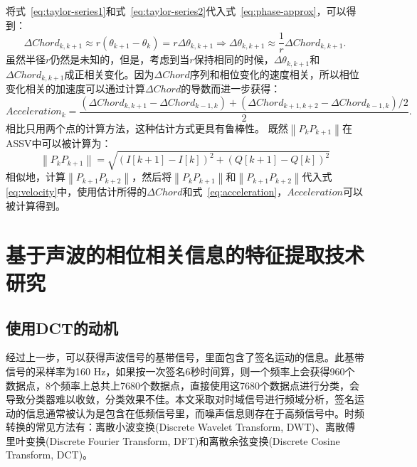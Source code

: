 将式~\eqref{eq:taylor-series1}和式~\eqref{eq:taylor-series2}代入式~\eqref{eq:phase-approx}，可以得到：
\begin{equation}
 \Delta Chord_{k,k+1} \approx r(\theta_{k+1} - \theta_{k})=r\Delta \theta_{k,k+1} \Rightarrow \Delta \theta_{k,k+1} \approx \frac{1}{r}\Delta Chord_{k,k+1}.  \label{eq:velocity}
\end{equation}
虽然半径$r$仍然是未知的，但是，考虑到当$r$保持相同的时候，$\Delta \theta_{k,k+1}$和$\Delta Chord_{k,k+1}$成正相关变化。因为$\Delta Chord$序列和相位变化的速度相关，所以相位变化相关的加速度可以通过计算$\Delta Chord$的导数而进一步获得：
\begin{equation}
Acceleration_{k} = \frac{\left( \Delta Chord_{k,k+1} - \Delta Chord_{k-1,k} \right) + \left( \Delta Chord_{k+1,k+2}- \Delta Chord_{k-1,k}\right)/2}{2}. \label{eq:acceleration}
\end{equation}
相比只用两个点的计算方法，这种估计方式更具有鲁棒性。
既然$\left\|P_{k}P_{k+1}\right\|$在ASSV中可以被计算为：
\begin{equation}
  \left\|P_{k}P_{k+1}\right\|= \sqrt{\left( I[k+1] - I[k] \right)^2 + \left( Q[k+1] - Q[k] \right)^2}
\end{equation}
相似地，计算$\left\|P_{k+1}P_{k+2}\right\|$，然后将$\left\|P_{k}P_{k+1}\right\|$和$\left\|P_{k+1}P_{k+2}\right\|$代入式\eqref{eq:velocity}中，使用估计所得的$\Delta Chord $和式~\eqref{eq:acceleration}，$Acceleration$可以被计算得到。



\section{基于声波的相位相关信息的特征提取技术研究}
\subsection{使用DCT的动机}
经过上一步，可以获得声波信号的基带信号，里面包含了签名运动的信息。此基带信号的采样率为160 Hz，如果按一次签名6秒时间算，则一个频率上会获得960个数据点，8个频率上总共上7680个数据点，直接使用这7680个数据点进行分类，会导致分类器难以收敛，分类效果不佳。本文采取对时域信号进行频域分析，签名运动的信息通常被认为是包含在低频信号里，而噪声信息则存在于高频信号中。时频转换的常见方法有：离散小波变换(Discrete Wavelet Transform, DWT)、离散傅里叶变换(Discrete Fourier Transform, DFT)和离散余弦变换(Discrete Cosine Transform, DCT)。


